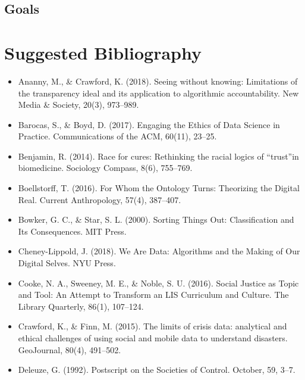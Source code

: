 \documentclass[a4paper,man,natbib]{apa6}
\begin{document}
   \subsection*{Goals}
   \clearpage
   \section{Suggested Bibliography}

   \begin{itemize}[label={},itemindent=-2em,leftmargin=2em]
   \item Ananny, M., \& Crawford, K. (2018). Seeing without knowing: Limitations of the transparency ideal and its application to algorithmic accountability. New Media \& Society, 20(3), 973–989.

   \item Barocas, S., \& Boyd, D. (2017). Engaging the Ethics of Data Science in Practice. Communications of the ACM, 60(11), 23–25.

   \item Benjamin, R. (2014). Race for cures: Rethinking the racial logics of “trust”in biomedicine. Sociology Compass, 8(6), 755–769.

   \item Boellstorff, T. (2016). For Whom the Ontology Turns: Theorizing the Digital Real. Current Anthropology, 57(4), 387–407.

   \item Bowker, G. C., \& Star, S. L. (2000). Sorting Things Out: Classification and Its Consequences. MIT Press.

   \item Cheney-Lippold, J. (2018). We Are Data: Algorithms and the Making of Our Digital Selves. NYU Press.

   \item Cooke, N. A., Sweeney, M. E., \& Noble, S. U. (2016). Social Justice as Topic and Tool: An Attempt to Transform an LIS Curriculum and Culture. The Library Quarterly, 86(1), 107–124.

   \item Crawford, K., \& Finn, M. (2015). The limits of crisis data: analytical and ethical challenges of using social and mobile data to understand disasters. GeoJournal, 80(4), 491–502.

   \item Deleuze, G. (1992). Postscript on the Societies of Control. October, 59, 3–7.


\end{itemize}
\end{document}

